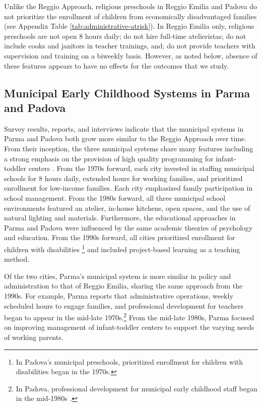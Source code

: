 Unlike the Reggio Approach, religious preschools in Reggio Emilia and Padova do not prioritize the enrollment of children from economically disadvantaged families (see Appendix Table \ref{tab:administrative-atrisk}).  In Reggio Emilia only, religious preschools are not open 8 hours daily; do not hire full-time atelieristas; do not include cooks and janitors in teacher trainings, and; do not provide teachers with supervision and training on a biweekly basis. However, as noted below, absence of these features appears to have no effects for the outcomes that we study.

\subsection{Municipal Early Childhood Systems in Parma and Padova}

Survey results, reports, and interviews indicate that the municipal systems in Parma and Padova both grow more similar to the Reggio Approach over time. From their inception, the three municipal systems share many features including a strong emphasis on the provision of high quality programming for infant-toddler centers \citep{Ghedini_2001_Ital-Natl-Policy}. From the 1970s forward, each city invested in staffing municipal schools for 8 hours daily, extended hours for working families, and prioritized enrollment for low-income families. Each city emphasized family participation in school management. From the 1980s forward, all three municipal school environments featured an atelier, in-house kitchens, open spaces, and the use of natural lighting and materials. Furthermore, the educational approaches in Parma and Padova were influenced by the same academic theories of psychology and education. From the 1990s forward, all cities prioritized enrollment for children with disabilities \footnote{In Padova's municipal preschools, prioritized enrollment for children with disabilities began in the 1970s.} and included project-based learning as a teaching method.

Of the two cities, Parma's municipal system is more similar in policy and administration to that of Reggio Emilia, sharing the same approach from the 1990s. For example, Parma reports that administrative operations, weekly scheduled hours to engage families, and professional development for teachers began to appear in the mid-late 1970s.\footnote{In Padova, professional development for municipal early childhood staff began in the mid-1980s \citep{Becchi-Ferrari_1990_Pub-Inf-Centres-Italy}.} From the mid-late 1980s, Parma focused on improving management of infant-toddler centers to support the varying needs of working parents.


